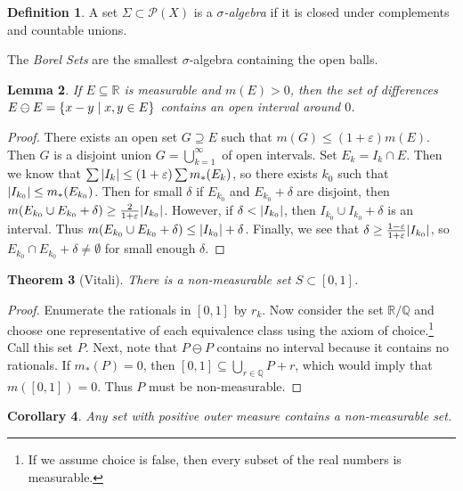 \documentclass[leqno, openany]{memoir}
\newtheorem{thm}{Theorem}[chapter]
\newtheorem{cor}[thm]{Corollary}
\newtheorem{lem}[thm]{Lemma}
\theoremstyle{definition}
\newtheorem{defn}[thm]{Definition}
\theoremstyle{remark}
\theoremstyle{plain}
\theoremstyle{definition}
\theoremstyle{remark}
\newcommand{\R}{\mathbb{R}}
\newcommand{\Q}{\mathbb{Q}}
\newcommand{\ep}{\varepsilon}
\newcommand{\mc}[1]{\mathcal{#1}}
\begin{document}
\begin{defn} A set $\Sigma \subset \mc{P}(X)$ is a \textit{$\sigma$-algebra} if
it is closed under complements and countable unions.  \end{defn}

The \textit{Borel Sets} are the smallest $\sigma$-algebra containing the open
balls.

\begin{lem} If $E \subseteq \R$ is measurable and $m(E) > 0$, then the set of
differences $E \ominus E = \qty{x - y \mid x,y \in E}$ contains an open
interval around $0$.  \end{lem}

\begin{proof} There exists an open set $G \supseteq E$ such that $m(G) \leq
    (1+\ep) m(E)$. Then $G$ is a disjoint union $G = \bigcup_{k=1}^{\infty}$ of
    open intervals. Set $E_k = I_k \cap E$. Then we know that $\sum \abs{I_k}
    \leq (1+\ep) \sum m_*(E_k)$, so there exists $k_0$ such that $\abs{I_{k_0}}
    \leq m_*(E_{k_0})$. Then for small $\delta$ if $E_{k_0}$ and $E_{k_0} +
    \delta$ are disjoint, then $m(E_{k_0} \cup E_{k_0} + \delta) \geq
    \frac{2}{1+\ep} \abs{I_{k_0}}$. However, if $\delta < \abs{I_{k_0}}$, then
    $I_{k_0} \cup I_{k_0} + \delta$ is an interval. Thus $m(E_{k_0} \cup
    E_{k_0} + \delta) \leq \abs{I_{k_0}} + \delta$. Finally, we see that
    $\delta \geq \frac{1-\ep}{1+\ep} \abs{I_{k_0}}$, so $E_{k_0} \cap E_{k_0} +
    \delta \neq \emptyset$ for small enough $\delta$.  \end{proof}

\begin{thm}[Vitali] There is a non-measurable set $S \subset [0,1]$.  \end{thm}

\begin{proof} Enumerate the rationals in $[0,1]$ by $r_k$. Now consider the set
    $\R / \Q$ and choose one representative of each equivalence class using the
    axiom of choice.\footnote{If we assume choice is false, then every subset
    of the real numbers is measurable.} Call this set $P$. Next, note that $P
    \ominus P$ contains no interval because it contains no rationals. If
    $m_*(P) = 0$, then $[0,1] \subseteq \bigcup_{r \in \Q} P + r$, which would
    imply that $m([0,1]) = 0$. Thus $P$ must be non-measurable.  \end{proof}

\begin{cor} Any set with positive outer measure contains a non-measurable set.
\end{cor}
\end{document}
